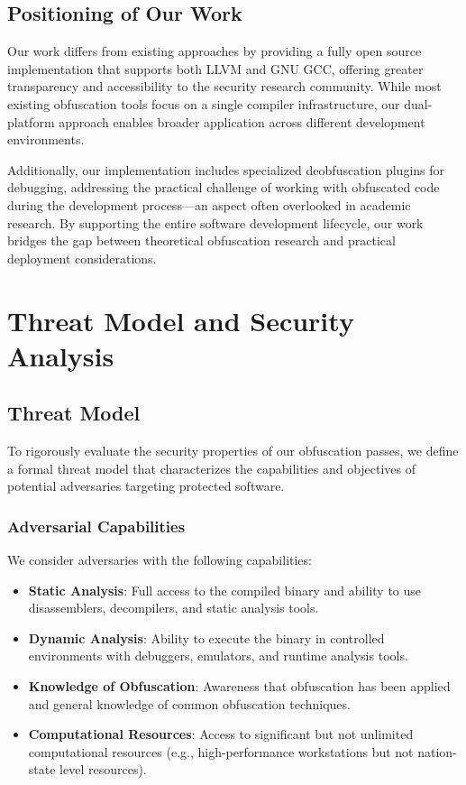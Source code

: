 \documentclass[conference]{IEEEtran}
\begin{document}
\subsection{Positioning of Our Work}
Our work differs from existing approaches by providing a fully open source implementation that supports both LLVM and GNU GCC, offering greater transparency and accessibility to the security research community. While most existing obfuscation tools focus on a single compiler infrastructure, our dual-platform approach enables broader application across different development environments.

Additionally, our implementation includes specialized deobfuscation plugins for debugging, addressing the practical challenge of working with obfuscated code during the development process—an aspect often overlooked in academic research. By supporting the entire software development lifecycle, our work bridges the gap between theoretical obfuscation research and practical deployment considerations.

\section{Threat Model and Security Analysis}

\subsection{Threat Model}
To rigorously evaluate the security properties of our obfuscation passes, we define a formal threat model that characterizes the capabilities and objectives of potential adversaries targeting protected software.

\subsubsection{Adversarial Capabilities}
We consider adversaries with the following capabilities:
\begin{itemize}
    \item \textbf{Static Analysis}: Full access to the compiled binary and ability to use disassemblers, decompilers, and static analysis tools.
    \item \textbf{Dynamic Analysis}: Ability to execute the binary in controlled environments with debuggers, emulators, and runtime analysis tools.
    \item \textbf{Knowledge of Obfuscation}: Awareness that obfuscation has been applied and general knowledge of common obfuscation techniques.
    \item \textbf{Computational Resources}: Access to significant but not unlimited computational resources (e.g., high-performance workstations but not nation-state level resources).
\end{itemize}
\end{document}
